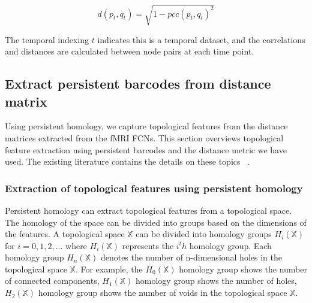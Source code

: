 \[
\mathit{d(p_t, q_t)} = 
\sqrt{ 1 - pcc(p_t, q_t)^2 }
\]

The temporal indexing $t$ indicates this is a temporal dataset, and the correlations and distances are calculated between node pairs at each time point.

\subsection{Extract persistent barcodes from distance matrix}
\label{sec:ms_to_pd}

Using persistent homology, we capture topological features from the distance matrices extracted from the fMRI FCNs. This section overviews topological feature extraction using persistent barcodes and the distance metric we have used. The existing literature contains the details on these topics ~\cite{edelsbrunner2008surveys, Topology_and_data}.

\subsubsection{Extraction of topological features using persistent homology}

Persistent homology can extract topological features from a topological space. The homology of the space can be divided into groups based on the dimensions of the features. A topological space $\mathbb{X}$ can be divided into homology groups $H_i(\mathbb{X})$ for $i={0, 1, 2, ...}$ where $H_i(\mathbb{X})$ represents the $i^th$ homology group. Each homology group $H_n(\mathbb{X})$ denotes the number of n-dimensional holes in the topological space $\mathbb{X}$. For example, the $H_0(\mathbb{X})$ homology group shows the number of connected components, $H_1(\mathbb{X})$ homology group shows the number of holes, $H_2(\mathbb{X})$ homology group shows the number of voids in the topological space $\mathbb{X}$. 

